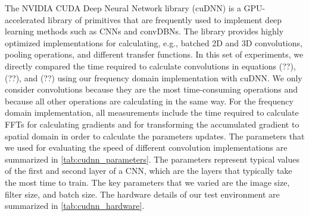 The NVIDIA CUDA Deep Neural Network library (cuDNN) \cite{chetlur2014} is a
GPU-accelerated library of primitives that are frequently used to implement deep
learning methods such as CNNs and convDBNs. The library provides highly
optimized implementations for calculating, e.g., batched 2D and 3D convolutions,
pooling operations, and different transfer functions. In this set of
experiments, we directly compared the time required to calculate convolutions in
equations (??), (??), and (??) using our frequency domain implementation with
cuDNN. We only consider convolutions because they are the most time-consuming
operations and because all other operations are calculating in the same way. For
the frequency domain implementation, all measurements include the time required
to calculate FFTs for calculating gradients and for transforming the accumulated
gradient to spatial domain in order to calculate the parameters updates. The
parameters that we used for evaluating the speed of different convolution
implementations are summarized in \ref{tab:cudnn_parameters}. The parameters
represent typical values of the first and second layer of a CNN, which are the
layers that typically take the most time to train. The key parameters that we
varied are the image size, filter size, and batch size. The hardware details of
our test environment are summarized in \ref{tab:cudnn_hardware}.



